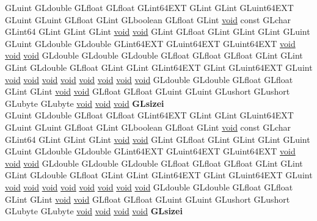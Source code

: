 \begin{DoxyCompactItemize}
\begin{tabbing}
\>GLuint GLdouble GLfloat GLfloat GLint64EXT GLint GLint GLuint64EXT GLuint GLuint GLfloat GLint GLboolean GLfloat GLint \hyperlink{interfacevoid}{void} const GLchar GLint64 GLint GLint GLint \hyperlink{interfacevoid}{void} \hyperlink{interfacevoid}{void} GLint GLfloat GLint GLint GLint GLuint GLuint GLdouble GLdouble GLint64EXT GLuint64EXT GLuint64EXT \hyperlink{interfacevoid}{void} \hyperlink{interfacevoid}{void} \hyperlink{interfacevoid}{void} GLdouble GLdouble GLdouble GLfloat GLfloat GLfloat GLint GLint GLint GLdouble GLfloat GLint GLint GLint64EXT GLint GLuint64EXT GLuint \hyperlink{interfacevoid}{void} \hyperlink{interfacevoid}{void} \hyperlink{interfacevoid}{void} \hyperlink{interfacevoid}{void} \hyperlink{interfacevoid}{void} \hyperlink{interfacevoid}{void} \hyperlink{interfacevoid}{void} \hyperlink{interfacevoid}{void} GLdouble GLdouble GLfloat GLfloat GLint GLint \hyperlink{interfacevoid}{void} \hyperlink{interfacevoid}{void} GLfloat GLfloat GLuint GLuint GLushort GLushort GLubyte GLubyte \hyperlink{interfacevoid}{void} \hyperlink{interfacevoid}{void} \hyperlink{interfacevoid}{void} {\bfseries GLsizei}\\
\>GLuint GLdouble GLfloat GLfloat GLint64EXT GLint GLint GLuint64EXT GLuint GLuint GLfloat GLint GLboolean GLfloat GLint \hyperlink{interfacevoid}{void} const GLchar GLint64 GLint GLint GLint \hyperlink{interfacevoid}{void} \hyperlink{interfacevoid}{void} GLint GLfloat GLint GLint GLint GLuint GLuint GLdouble GLdouble GLint64EXT GLuint64EXT GLuint64EXT \hyperlink{interfacevoid}{void} \hyperlink{interfacevoid}{void} \hyperlink{interfacevoid}{void} GLdouble GLdouble GLdouble GLfloat GLfloat GLfloat GLint GLint GLint GLdouble GLfloat GLint GLint GLint64EXT GLint GLuint64EXT GLuint \hyperlink{interfacevoid}{void} \hyperlink{interfacevoid}{void} \hyperlink{interfacevoid}{void} \hyperlink{interfacevoid}{void} \hyperlink{interfacevoid}{void} \hyperlink{interfacevoid}{void} \hyperlink{interfacevoid}{void} \hyperlink{interfacevoid}{void} GLdouble GLdouble GLfloat GLfloat GLint GLint \hyperlink{interfacevoid}{void} \hyperlink{interfacevoid}{void} GLfloat GLfloat GLuint GLuint GLushort GLushort GLubyte GLubyte \hyperlink{interfacevoid}{void} \hyperlink{interfacevoid}{void} \hyperlink{interfacevoid}{void} \hyperlink{interfacevoid}{void} {\bfseries GLsizei}\\

\end{tabbing}
\end{DoxyCompactItemize}
